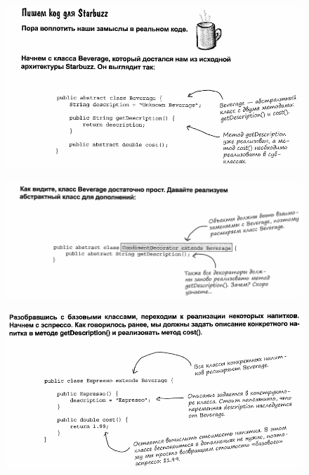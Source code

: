 \documentclass{beamer}
\begin{document}
\begin{frame}
\begin{figure}[h]
\centering
\includegraphics[scale=0.5]{images/lec10-pic18.png}
\label{pic-sort}
\end{figure}
\end{frame}

\begin{frame}
\begin{figure}[h]
\centering
\includegraphics[scale=0.5]{images/lec10-pic19.png}
\label{pic-sort}
\end{figure}
\end{frame}

\begin{frame}
\begin{figure}[h]
\centering
\includegraphics[scale=0.5]{images/lec10-pic20.png}
\label{pic-sort}
\end{figure}
\end{frame}
\end{document}

